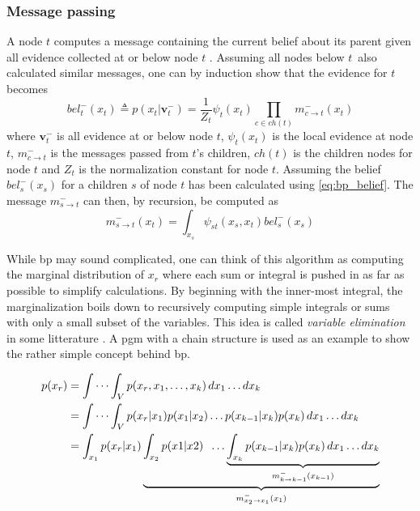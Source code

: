 \subsubsection{Message passing}
A node $t$ computes a message containing the current belief about its parent given all evidence collected at or below node $t$ \cite{murphy}. Assuming all nodes below $t$ also calculated similar messages, one can by induction show that the evidence for $t$ becomes
\begin{equation}\label{eq:bp_belief}
    bel_t^-(x_t) \triangleq p(x_t | \mathbf{v}_t^-) = \frac{1}{Z_t}\psi_t(x_t) \prod_{c \in ch(t)} m_{c\to t}^-(x_t)
\end{equation}
where $\mathbf{v}_t^-$ is all evidence at or below node $t$, $\psi_t(x_t)$ is the local evidence at node $t$, $m_{c \to t}^-$ is the messages passed from $t$'s children, $ch(t)$ is the children nodes for node $t$ and $Z_t$ is the normalization constant for node $t$.
Assuming the belief $bel_s^-(x_s)$ for a children $s$ of node $t$ has been calculated using \cref{eq:bp_belief}. The message $m_{s\to t}^-$ can then, by recursion, be computed as
\begin{equation}\label{eq:bp_message}
    m_{s \to t}^-(x_t) = \int_{x_s} \psi_{st}(x_s, x_t) bel_s^-(x_s)
\end{equation}

While \acrshort{bp} may sound complicated, one can think of this algorithm as computing the marginal distribution of $x_r$ where each sum or integral is pushed in as far as possible to simplify calculations. By beginning with the inner-most integral, the marginalization boils down to recursively computing simple integrals or sums with only a small subset of the variables. This idea is called \textit{variable elimination} in some litterature \cite{murphy}. A \acrshort{pgm} with a chain structure is used as an example to show the rather simple concept behind \acrshort{bp}.

\begin{subequations}
\begin{align}
p(x_r) &= \idotsint_V p(x_r, x_1,\dots,x_k) \,dx_1 \dots dx_k\\
&= \idotsint_V p(x_r | x_1)p(x_1|x_2)\dots p(x_{k-1} | x_k)p(x_k) \, dx_1 \dots dx_k\\
&= \int_{x_1} p(x_r | x_1)\underbrace{\int_{x_2}p(x1 | x2) \; \;  \dots \underbrace{\int_{x_k} p(x_{k-1} | x_k)p(x_k) \, dx_1 \dots dx_k}_{m_{k\to k-1}^-(x_{k-1})}}_{m_{x_2 \to x_1}^-(x_1)}
\end{align}
\end{subequations}

